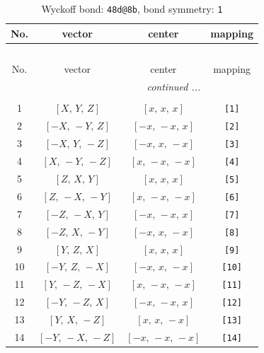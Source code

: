 \documentclass[fleqn,8pt]{jsarticle}
\begin{document}
\begin{longtable}{cccc}
\caption{Wyckoff bond: {\tt 48d@8b}, bond symmetry: {\tt 1}}
 \\
 \hline \hline
No. & vector & center & mapping \\ \hline \endfirsthead

\multicolumn{3}{l}{\tablename\ \thetable{}} \\
 \hline \hline
No. & vector & center & mapping \\ \hline \endhead

 \hline \hline
\multicolumn{3}{r}{\footnotesize\it continued ...} \\ \endfoot

 \hline \hline
\multicolumn{3}{r}{} \\ \endlastfoot

1 & $\left[ X,\, Y,\, Z \right]$ & $\left[ x,\, x,\, x \right]$ & {\tt [1]} \\ \hline
2 & $\left[ - X,\, - Y,\, Z \right]$ & $\left[ - x,\, - x,\, x \right]$ & {\tt [2]} \\ \hline
3 & $\left[ - X,\, Y,\, - Z \right]$ & $\left[ - x,\, x,\, - x \right]$ & {\tt [3]} \\ \hline
4 & $\left[ X,\, - Y,\, - Z \right]$ & $\left[ x,\, - x,\, - x \right]$ & {\tt [4]} \\ \hline
5 & $\left[ Z,\, X,\, Y \right]$ & $\left[ x,\, x,\, x \right]$ & {\tt [5]} \\ \hline
6 & $\left[ Z,\, - X,\, - Y \right]$ & $\left[ x,\, - x,\, - x \right]$ & {\tt [6]} \\ \hline
7 & $\left[ - Z,\, - X,\, Y \right]$ & $\left[ - x,\, - x,\, x \right]$ & {\tt [7]} \\ \hline
8 & $\left[ - Z,\, X,\, - Y \right]$ & $\left[ - x,\, x,\, - x \right]$ & {\tt [8]} \\ \hline
9 & $\left[ Y,\, Z,\, X \right]$ & $\left[ x,\, x,\, x \right]$ & {\tt [9]} \\ \hline
10 & $\left[ - Y,\, Z,\, - X \right]$ & $\left[ - x,\, x,\, - x \right]$ & {\tt [10]} \\ \hline
11 & $\left[ Y,\, - Z,\, - X \right]$ & $\left[ x,\, - x,\, - x \right]$ & {\tt [11]} \\ \hline
12 & $\left[ - Y,\, - Z,\, X \right]$ & $\left[ - x,\, - x,\, x \right]$ & {\tt [12]} \\ \hline
13 & $\left[ Y,\, X,\, - Z \right]$ & $\left[ x,\, x,\, - x \right]$ & {\tt [13]} \\ \hline
14 & $\left[ - Y,\, - X,\, - Z \right]$ & $\left[ - x,\, - x,\, - x \right]$ & {\tt [14]} \\ \hline

\end{longtable}
\end{document}
